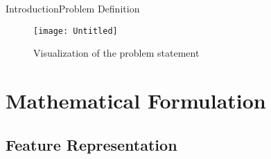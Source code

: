 \documentclass[10pt]{beamer}
\begin{document}
\begin{frame}{Introduction}{Problem Definition}
\begin{figure}[t]
    \centering
    \texttt{[image: Untitled]}
    \caption{Visualization of the problem statement}
  \end{figure}
\end{frame}


\section{Mathematical Formulation}
\subsection{Feature Representation}




\end{document}
